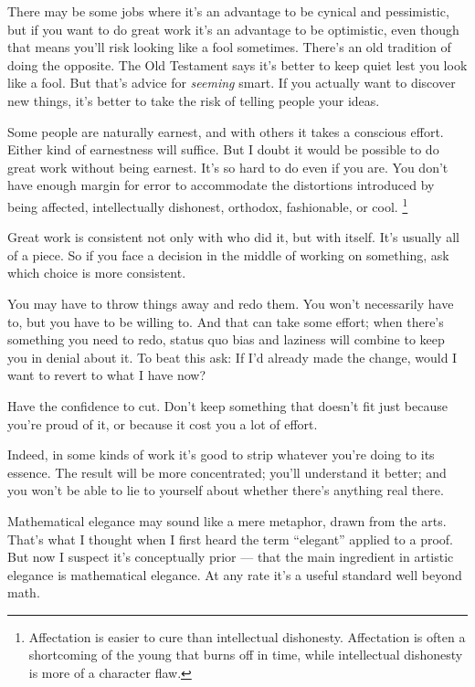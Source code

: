 There may be some jobs where it's an advantage to be cynical and
pessimistic, but if you want to do great work it's an advantage to be
optimistic, even though that means you'll risk looking like a fool
sometimes. There's an old tradition of doing the opposite. The Old
Testament says it's better to keep quiet lest you look like a fool. But
that's advice for \emph{seeming} smart. If you actually want to discover
new things, it's better to take the risk of telling people your ideas.

Some people are naturally earnest, and with others it takes a conscious
effort. Either kind of earnestness will suffice. But I doubt it would be
possible to do great work without being earnest. It's so hard to do even
if you are. You don't have enough margin for error to accommodate the
distortions introduced by being affected, intellectually dishonest,
orthodox, fashionable, or cool. \footnote{Affectation is easier to cure than intellectual dishonesty.
Affectation is often a shortcoming of the young that burns off in time,
while intellectual dishonesty is more of a character flaw.}

Great work is consistent not only with who did it, but with itself. It's
usually all of a piece. So if you face a decision in the middle of
working on something, ask which choice is more consistent.

You may have to throw things away and redo them. You won't necessarily
have to, but you have to be willing to. And that can take some effort;
when there's something you need to redo, status quo bias and laziness
will combine to keep you in denial about it. To beat this ask: If I'd
already made the change, would I want to revert to what I have now?

Have the confidence to cut. Don't keep something that doesn't fit just
because you're proud of it, or because it cost you a lot of effort.

Indeed, in some kinds of work it's good to strip whatever you're doing
to its essence. The result will be more concentrated; you'll understand
it better; and you won't be able to lie to yourself about whether
there's anything real there.

Mathematical elegance may sound like a mere metaphor, drawn from the
arts. That's what I thought when I first heard the term ``elegant''
applied to a proof. But now I suspect it's conceptually prior --- that
the main ingredient in artistic elegance is mathematical elegance. At
any rate it's a useful standard well beyond math.

